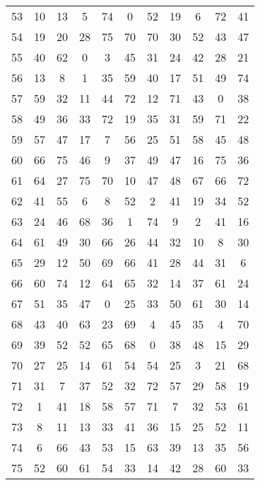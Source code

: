 \begin{table}
\begin{tabular}{c c c c c c c c c c c }
53 & 10 & 13 & 5 & 74 & 0 & 52 & 19 & 6 & 72 & 41 \\
54 & 19 & 20 & 28 & 75 & 70 & 70 & 30 & 52 & 43 & 47 \\
55 & 40 & 62 & 0 & 3 & 45 & 31 & 24 & 42 & 28 & 21 \\
56 & 13 & 8 & 1 & 35 & 59 & 40 & 17 & 51 & 49 & 74 \\
57 & 59 & 32 & 11 & 44 & 72 & 12 & 71 & 43 & 0 & 38 \\
58 & 49 & 36 & 33 & 72 & 19 & 35 & 31 & 59 & 71 & 22 \\
59 & 57 & 47 & 17 & 7 & 56 & 25 & 51 & 58 & 45 & 48 \\
60 & 66 & 75 & 46 & 9 & 37 & 49 & 47 & 16 & 75 & 36 \\
61 & 64 & 27 & 75 & 70 & 10 & 47 & 48 & 67 & 66 & 72 \\
62 & 41 & 55 & 6 & 8 & 52 & 2 & 41 & 19 & 34 & 52 \\
63 & 24 & 46 & 68 & 36 & 1 & 74 & 9 & 2 & 41 & 16 \\
64 & 61 & 49 & 30 & 66 & 26 & 44 & 32 & 10 & 8 & 30 \\
65 & 29 & 12 & 50 & 69 & 66 & 41 & 28 & 44 & 31 & 6 \\
66 & 60 & 74 & 12 & 64 & 65 & 32 & 14 & 37 & 61 & 24 \\
67 & 51 & 35 & 47 & 0 & 25 & 33 & 50 & 61 & 30 & 14 \\
68 & 43 & 40 & 63 & 23 & 69 & 4 & 45 & 35 & 4 & 70 \\
69 & 39 & 52 & 52 & 65 & 68 & 0 & 38 & 48 & 15 & 29 \\
70 & 27 & 25 & 14 & 61 & 54 & 54 & 25 & 3 & 21 & 68 \\
71 & 31 & 7 & 37 & 52 & 32 & 72 & 57 & 29 & 58 & 19 \\
72 & 1 & 41 & 18 & 58 & 57 & 71 & 7 & 32 & 53 & 61 \\
73 & 8 & 11 & 13 & 33 & 41 & 36 & 15 & 25 & 52 & 11 \\
74 & 6 & 66 & 43 & 53 & 15 & 63 & 39 & 13 & 35 & 56 \\
75 & 52 & 60 & 61 & 54 & 33 & 14 & 42 & 28 & 60 & 33 \\
\hline
\end{tabular}
\end{table}